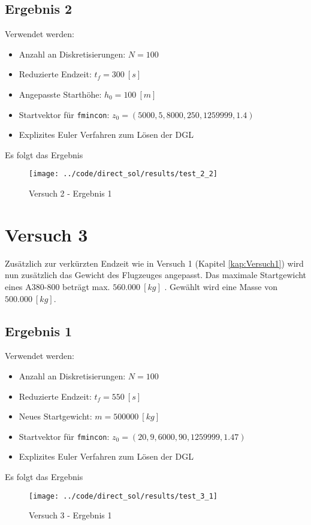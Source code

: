 \newpage
\subsection{Ergebnis 2}
Verwendet werden:
\begin{itemize}
\item Anzahl an Diskretisierungen: $N = 100$ 
\item Reduzierte Endzeit: $t_f = 300 \ [s]$
\item Angepasste Starthöhe: $h_0 = 100 \ [m]$
\item Startvektor für \texttt{fmincon}: $z_0 = (5000,5,8000,250,1259999,1.4)$
\item Explizites Euler Verfahren zum Lösen der DGL
\end{itemize}
Es folgt das Ergebnis
\begin{figure}[H]
\begin{center}
\texttt{[image: ../code/direct\_sol/results/test\_2\_2]}
\caption{Versuch 2 - Ergebnis 1}\label{img:test_2_2}
\end{center}
\end{figure}
















\newpage
\section{Versuch 3}
Zusätzlich zur verkürzten Endzeit wie in Versuch 1 (Kapitel \ref{kap:Versuch1}) wird nun zusätzlich das Gewicht des Flugzeuges angepasst. Das maximale Startgewicht eines A380-800 beträgt max. $560.000 \ [kg]$ \cite{A380Tech}. Gewählt wird eine Masse von $500.000 \ [kg]$.

\subsection{Ergebnis 1}
Verwendet werden:
\begin{itemize}
\item Anzahl an Diskretisierungen: $N = 100$ 
\item Reduzierte Endzeit: $t_f = 550 \ [s]$
\item Neues Startgewicht: $m = 500000 \ [kg]$
\item Startvektor für \texttt{fmincon}: $z_0 = (20,9,6000,90,1259999,1.47)$
\item Explizites Euler Verfahren zum Lösen der DGL
\end{itemize}
Es folgt das Ergebnis
\begin{figure}[H]
\begin{center}
\texttt{[image: ../code/direct\_sol/results/test\_3\_1]}
\caption{Versuch 3 - Ergebnis 1}\label{img:test_3_1}
\end{center}
\end{figure}


